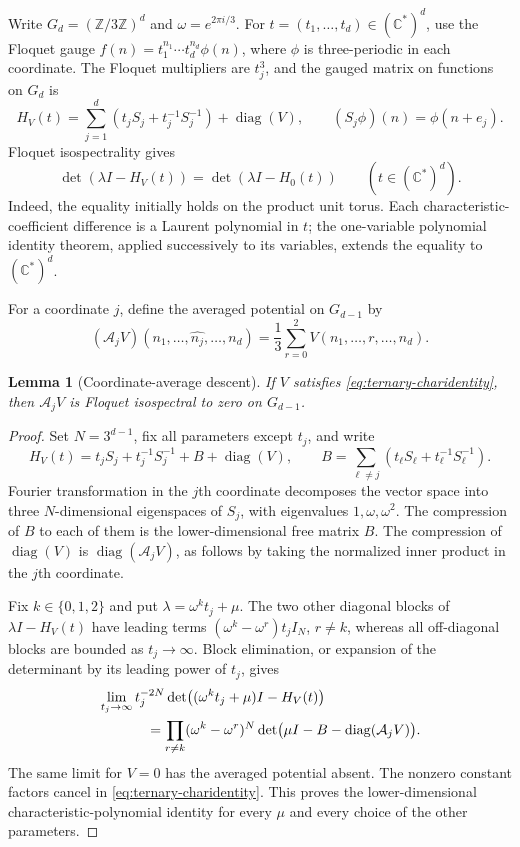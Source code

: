 \documentclass[11pt,a4paper]{article}
\newtheorem{lemma}{Lemma}[section]
\theoremstyle{definition}
\theoremstyle{remark}\newtheorem{remark}[lemma]{Remark}
\newcommand{\Z}{\mathbb Z}\newcommand{\Q}{\mathbb Q}
\newcommand{\C}{\mathbb C}\newcommand{\F}{\mathbb F}
\begin{document}
Write $G_d=(\Z/3\Z)^d$ and $\omega=e^{2\pi i/3}$. For
$t=(t_1,\ldots,t_d)\in(\C^*)^d$, use the Floquet gauge
$f(n)=t_1^{n_1}\cdots t_d^{n_d}\phi(n)$, where $\phi$ is three-periodic
in each coordinate. The Floquet multipliers are $t_j^3$, and the gauged
matrix on functions on $G_d$ is
\begin{equation}\label{eq:ternary-gauge}
 H_V(t)=\sum_{j=1}^d(t_jS_j+t_j^{-1}S_j^{-1})+\operatorname{diag}(V),
 \qquad (S_j\phi)(n)=\phi(n+e_j).
\end{equation}
Floquet isospectrality gives
\begin{equation}\label{eq:ternary-charidentity}
 \det(\lambda I-H_V(t))=\det(\lambda I-H_0(t))
 \qquad(t\in(\C^*)^d).
\end{equation}
Indeed, the equality initially holds on the product unit torus. Each
characteristic-coefficient difference is a Laurent polynomial in $t$;
the one-variable polynomial identity theorem, applied successively to its
variables, extends the equality to $(\C^*)^d$.

For a coordinate $j$, define the averaged potential on $G_{d-1}$ by
\[
 (\mathcal A_jV)(n_1,\ldots,\widehat{n_j},\ldots,n_d)
   =\frac13\sum_{r=0}^2V(n_1,\ldots,r,\ldots,n_d).
\]

\begin{lemma}[Coordinate-average descent]\label{lem:average-descent}
If $V$ satisfies \eqref{eq:ternary-charidentity}, then $\mathcal A_jV$
is Floquet isospectral to zero on $G_{d-1}$.
\end{lemma}
\begin{proof}
Set $N=3^{d-1}$, fix all parameters except $t_j$, and write
\[
 H_V(t)=t_jS_j+t_j^{-1}S_j^{-1}+B+\operatorname{diag}(V),
 \qquad
 B=\sum_{\ell\ne j}(t_\ell S_\ell+t_\ell^{-1}S_\ell^{-1}).
\]
Fourier transformation in the $j$th coordinate decomposes the vector space
into three $N$-dimensional eigenspaces of $S_j$, with eigenvalues
$1,\omega,\omega^2$. The compression of $B$ to each of them is the
lower-dimensional free matrix $B$. The compression of
$\operatorname{diag}(V)$ is $\operatorname{diag}(\mathcal A_jV)$, as follows
by taking the normalized inner product in the $j$th coordinate.

Fix $k\in\{0,1,2\}$ and put $\lambda=\omega^kt_j+\mu$. The two other
diagonal blocks of $\lambda I-H_V(t)$ have leading terms
$(\omega^k-\omega^r)t_j I_N$, $r\ne k$, whereas all off-diagonal blocks
are bounded as $t_j\to\infty$. Block elimination, or expansion of the
determinant by its leading power of $t_j$, gives
\begin{align*}
 &\lim_{t_j\to\infty}t_j^{-2N}
     \det\bigl((\omega^kt_j+\mu)I-H_V(t)\bigr)\\
 &\hspace{12mm}=
 \prod_{r\ne k}(\omega^k-\omega^r)^N
 \det\bigl(\mu I-B-\operatorname{diag}(\mathcal A_jV)\bigr).
\end{align*}
The same limit for $V=0$ has the averaged potential absent. The nonzero
constant factors cancel in \eqref{eq:ternary-charidentity}. This proves
the lower-dimensional characteristic-polynomial identity for every $\mu$
and every choice of the other parameters.
\end{proof}
\end{document}
